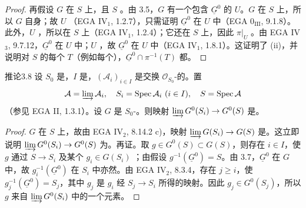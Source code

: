 \begin{proof}
再假设 $G$ 在 $S$ 上，且 $S$ 。由 3.5，$G$ 有一个包含 $\underline G^0$ 的 $U$。$G$ 在 $S$ 上，所以 $G$ 自身；故 $U$ （EGA IV$_1$, 1.2.7），只需证明 $\underline G^0$ 在 $U$ 中（EGA 0$_{\mathrm{III}}$, 9.1.8）。
此外，$U$ ，所以在 $S$ 上（EGA IV$_1$, 1.2.4）；它还在 $S$ 上，因此 $\pi|_U$ 。由 EGA IV$_3$, 9.7.12，$\underline G^0$ 在 $U$ 中；$U$ ，故 $\underline G^0$ 在 $U$ 中（EGA IV$_1$, 1.8.1）。这证明了 (ii)，并说明对 $S$ 的每个 $T$（例如每个），$\underline G^0\cap\pi^{-1}(T)$ 都。
\end{proof}
\begin{SGAresult}{推论}{3.8}
设 $S_0$ 是，$I$ 是，$(\mathcal A_i)_{i\in I}$ 是交换 $\mathcal O_{S_0}$-的。置
\[
\mathcal A=\varinjlim\mathcal A_i,\quad S_i=\operatorname{Spec}\mathcal A_i\ (i\in I),\quad S=\operatorname{Spec}\mathcal A
\]
（参见 EGA II, 1.3.1）。设 $G$ 是 $S_0$-。则映射 $\varinjlim G^0(S_i)\to G^0(S)$ 是。
\end{SGAresult}
\begin{proof}
$G$ 在 $S$ 上，故由 EGA IV$_2$, 8.14.2 c)，映射 $\varinjlim G(S_i)\to G(S)$ 是。这立即说明 $\varinjlim G^0(S_i)\to G^0(S)$ 为。再证。取 $g\in G^0(S)\subset G(S)$，则存在 $i\in I$，使 $g$ 通过 $S\to S_i$ 及某个 $g_i\in G(S_i)$ ；由假设 $g^{-1}(\underline G^0)=S$。由 3.7，$\underline G^0$ 在 $G$ 中，故 $g_i^{-1}(\underline G^0)$ 在 $S_i$ 中亦然。由 EGA IV$_2$, 8.3.4，存在 $j\geq i$，使 $g_j^{-1}(\underline G^0)=S_j$，其中 $g_j$ 是 $g_i$ 经 $S_j\to S_i$ 所得的映射。因此 $g_j\in G^0(S_j)$，所以 $g$ 来自 $\varinjlim G^0(S_i)$ 中的一个元素。
\end{proof}
